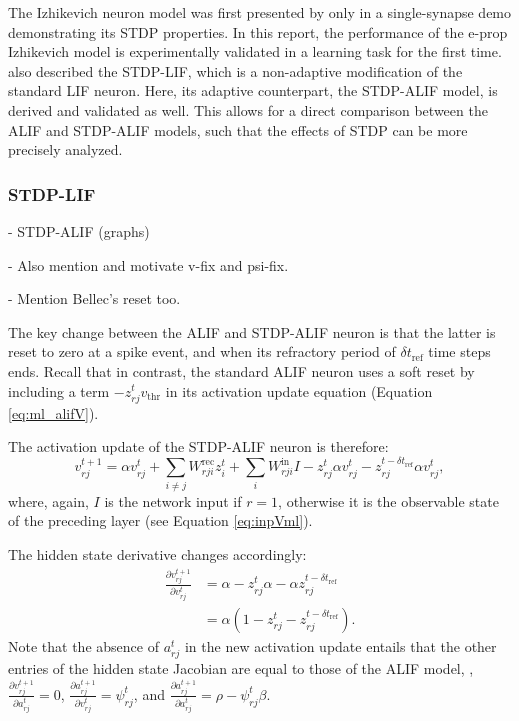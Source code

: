 		The Izhikevich neuron model was first presented by \cite{traub2020learning} only in a single-synapse demo demonstrating its STDP properties.
		In this report, the performance of the e-prop Izhikevich model is experimentally validated in a learning task for the first time.
		\cite{traub2020learning} also described the STDP-LIF, which is a non-adaptive modification of the standard LIF neuron.
		Here, its adaptive counterpart, the STDP-ALIF model, is derived and validated as well.
		This allows for a direct comparison between the ALIF and STDP-ALIF models, such that the effects of STDP can be more precisely analyzed.

		\subsubsection{STDP-LIF}

			\begin{tcolorbox}[colback=orange]
			- STDP-ALIF (graphs)

			- Also mention and motivate v-fix and psi-fix.

			- Mention Bellec's reset too.
			\end{tcolorbox}

			The key change between the ALIF and STDP-ALIF neuron is that the latter is reset to zero at a spike event, and when its refractory period of $\delta t_\text{ref}$ time steps ends.
			Recall that in contrast, the standard ALIF neuron uses a soft reset by including a term $-z^t_{rj}v_\text{thr}$ in its activation update equation (Equation \ref{eq:ml_alifV}).

			The activation update of the STDP-ALIF neuron is therefore:
			\begin{equation}\label{eq:ml_stdpalifV}
	        v^{t+1}_{rj} = \alpha v_{rj}^t + \sum_{i\neq j}W^\text{rec}_{rji}z_i^t + \sum_i W^\text{in}_{rji}I -z^t_{rj}\alpha v^t_{rj} - z_{rj}^{t-\delta t_\text{ref}}\alpha v^t_{rj},
	        \end{equation}
	        where, again, $I$ is the network input if $r=1$, otherwise it is the observable state of the preceding layer (see Equation \ref{eq:inpVml}).

	        The hidden state derivative changes accordingly:
	        \begin{align}
	        \frac{\partial v_{rj}^{t+1}}{\partial v^t_{rj}} &= \alpha - z^t_{rj}\alpha - \alpha z_{rj}^{t-\delta t_\text{ref}}\\
	        &= \alpha\left(1 - z^t_{rj} - z_{rj}^{t-\delta t_\text{ref}}\right).
	        \end{align}
	        Note that the absence of $a^t_{rj}$ in the new activation update entails that the other entries of the hidden state Jacobian are equal to those of the ALIF model, \ie, $\frac{\partial v^{t+1}_{rj}}{\partial a^t_{rj}}=0$, $\frac{\partial a^{t+1}_{rj}}{\partial v^t_{rj}}=\psi^t_{rj}$, and $\frac{\partial a^{t+1}_{rj}}{\partial a^t_{rj}} = \rho - \psi^t_{rj}\beta$.


